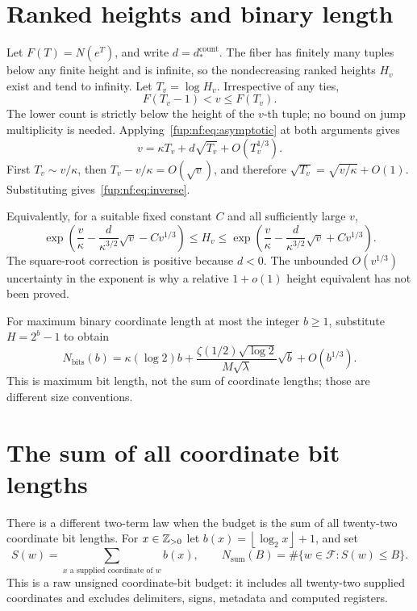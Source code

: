 \documentclass[11pt,letterpaper]{article}
\theoremstyle{definition}\newtheorem{definition}[theorem]{Definition}
\theoremstyle{remark}\newtheorem{remark}[theorem]{Remark}
\newcommand{\floor}[1]{\left\lfloor #1\right\rfloor}
\begin{document}
\section{Ranked heights and binary length}\label{fup:nf:sec:inverse}
Let $F(T)=N(e^T)$, and write $d=d_*^{\mathrm{count}}$. The fiber has finitely many tuples below any finite height and is infinite, so the nondecreasing ranked heights $H_v$ exist and tend to infinity. Let $T_v=\log H_v$. Irrespective of any ties,
\begin{equation}\label{fup:nf:eq:ties}
 F(T_v-1)<v\le F(T_v).
\end{equation}
The lower count is strictly below the height of the $v$-th tuple; no bound on jump multiplicity is needed. Applying~\eqref{fup:nf:eq:asymptotic} at both arguments gives
\[
 v=\kappa T_v+d\sqrt{T_v}+O(T_v^{1/3}).
\]
First $T_v\sim v/\kappa$, then $T_v-v/\kappa=O(\sqrt v)$, and therefore $\sqrt{T_v}=\sqrt{v/\kappa}+O(1)$. Substituting gives~\eqref{fup:nf:eq:inverse}.

Equivalently, for a suitable fixed constant $C$ and all sufficiently large $v$,
\[
 \exp\left(\frac v\kappa-\frac d{\kappa^{3/2}}\sqrt v-Cv^{1/3}\right)
 \le H_v\le
 \exp\left(\frac v\kappa-\frac d{\kappa^{3/2}}\sqrt v+Cv^{1/3}\right).
\]
The square-root correction is positive because $d<0$. The unbounded $O(v^{1/3})$ uncertainty in the exponent is why a relative $1+o(1)$ height equivalent has not been proved.

For maximum binary coordinate length at most the integer $b\ge1$, substitute $H=2^b-1$ to obtain
\[
 N_{\mathrm{bits}}(b)=\kappa(\log2)b+
 \frac{\zeta(1/2)\sqrt{\log2}}{M\sqrt\lambda}\sqrt b+O(b^{1/3}).
\]
This is maximum bit length, not the sum of coordinate lengths; those are different size conventions.

\section{The sum of all coordinate bit lengths}\label{fup:nf:sec:totalbits}
There is a different two-term law when the budget is the sum of all twenty-two coordinate bit lengths. For $x\in\mathbb Z_{>0}$ let $b(x)=\floor{\log_2x}+1$, and set
\[
 S(w)=\sum_{x\text{ a supplied coordinate of }w}b(x),\qquad
 N_{\mathrm{sum}}(B)=\#\{w\in\mathcal F:S(w)\le B\}.
\]
This is a raw unsigned coordinate-bit budget: it includes all twenty-two supplied coordinates and excludes delimiters, signs, metadata and computed registers.
\end{document}
